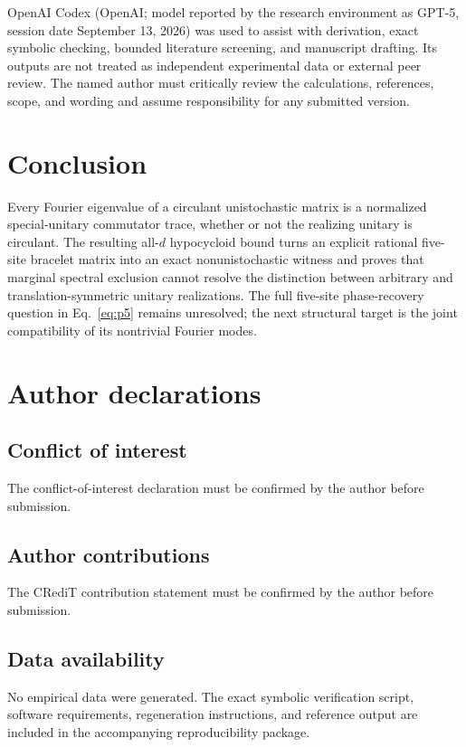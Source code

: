 \documentclass[aip,jmp,preprint,onecolumn,nofootinbib]{revtex4-2}
\begin{document}
OpenAI Codex (OpenAI; model reported by the research environment as GPT-5,
session date September 13, 2026) was used to assist with derivation, exact
symbolic checking, bounded literature screening, and manuscript drafting.  Its
outputs are not treated as independent experimental data or external peer
review.  The named author must critically review the calculations, references,
scope, and wording and assume responsibility for any submitted version.

\section{Conclusion}

Every Fourier eigenvalue of a circulant unistochastic matrix is a normalized
special-unitary commutator trace, whether or not the realizing unitary is
circulant.  The resulting all-$d$ hypocycloid bound turns an explicit rational
five-site bracelet matrix into an exact nonunistochastic witness and proves
that marginal spectral exclusion cannot resolve the distinction between
arbitrary and translation-symmetric unitary realizations.  The full five-site
phase-recovery question in Eq.~\eqref{eq:p5} remains unresolved; the next
structural target is the joint compatibility of its nontrivial Fourier modes.

\section*{Author declarations}

\subsection*{Conflict of interest}
The conflict-of-interest declaration must be confirmed by the author before
submission.

\subsection*{Author contributions}
The CRediT contribution statement must be confirmed by the author before
submission.

\subsection*{Data availability}
No empirical data were generated.  The exact symbolic verification script,
software requirements, regeneration instructions, and reference output are
included in the accompanying reproducibility package.


\end{document}
